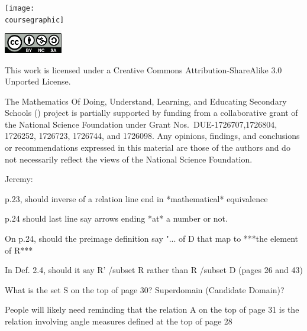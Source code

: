 \documentclass[11pt]{article}
\theoremstyle{definition}
\begin{document}
\maketitle
\ifthenelse{\equal{\coursegraphic}{}} %
	{}
	{\begin{center}\texttt{[image: \\coursegraphic]}\end{center}}
	
\vfill 
\begin{center} \includegraphics[width=1in]{by-nc-sa.png} \end{center}
\footnotesize{ This work is licensed under a Creative Commons Attribution-ShareAlike 3.0 Unported License. }

\footnotesize{
The Mathematics Of Doing, Understand, Learning, and Educating Secondary Schools (\MODULES) project is partially supported by funding from a collaborative grant of the National Science Foundation under Grant Nos.~DUE-1726707,1726804, 1726252, 1726723, 1726744, and 1726098.  Any opinions, findings, and conclusions or recommendations expressed in this material are those of the authors and do not necessarily reflect the views of the National Science Foundation.}
\newpage
\thispagestyle{plain}   
\listoftodos
\tableofcontents
\newpage {}



Jeremy:

p.23, should inverse of a relation line end in *mathematical* equivalence

p.24 should last line say arrows ending *at* a number or not.

On p.24, should the preimage definition say "... of D that map to ***the element of R***

In Def. 2.4, should it say R' /subset R rather than R /subset D (pages 26 and 43) 

What is the set  S on the top of page 30? Superdomain (Candidate Domain)?

People will likely need reminding that the relation A on the top of page 31 is the relation involving angle measures defined at the top of page 28
\end{document}
